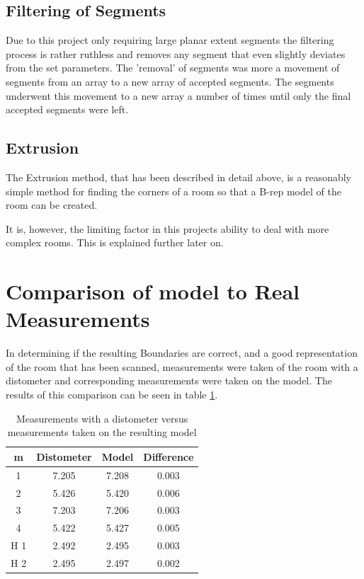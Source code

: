		\subsection{Filtering of Segments}
			Due to this project only requiring large planar extent segments the filtering process is rather ruthless and removes any segment that even slightly deviates from the set parameters. The 'removal' of segments was more a movement of segments from an array to a new array of accepted segments. The segments underwent this movement to a new array a number of times until only the final accepted segments were left. 
			
		\subsection{Extrusion}
			The Extrusion method, that has been described in detail above, is a reasonably simple method for finding the corners of a room so that a B-rep model of the room can be created.
			
			It is, however, the limiting factor in this projects ability to deal with more complex rooms. This is explained further later on.
	
	
	\section{Comparison of model to Real Measurements}
		\label{Comparison}
		In determining if the resulting Boundaries are correct, and a good representation of the room that has been scanned, measurements were taken of the room with a distometer and corresponding measurements were taken on the model. The results of this comparison can be seen in table \ref{MeasurmensTable}. 
		
		\begin{table}[H]
			\centering
			\begin{tabular}{|c|c c c|}
				\hline m & Distometer & Model & Difference \\ 
				\hline 1 & 7.205 & 7.208 & 0.003 \\ 
				\hline 2 & 5.426 & 5.420 & 0.006 \\ 
				\hline 3 & 7.203 & 7.206 & 0.003 \\ 
				\hline 4 & 5.422 & 5.427 & 0.005 \\ 
				\hline H 1 & 2.492 & 2.495 & 0.003 \\ 
				\hline H 2 & 2.495 & 2.497 & 0.002 \\ 
				\hline
			\end{tabular}
			\caption{Measurements with a distometer versus measurements taken on the resulting model}
			\label{MeasurmensTable}
		\end{table}
		
